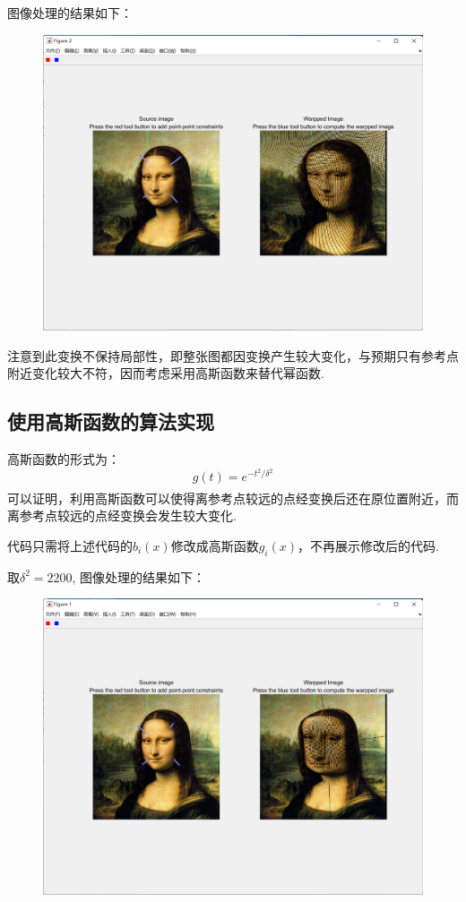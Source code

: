 \documentclass[12pt]{article}
\newcommand{\upcite}[1]{\textsuperscript{\textsuperscript{\cite{#1}}}}
\begin{document}
图像处理的结果如下：
\begin{figure}[H]
    \centering
    \includegraphics[scale=0.4]{pic1.png}
\end{figure}

注意到此变换不保持局部性，即整张图都因变换产生较大变化，与预期只有参考点附近变化较大不符，因而考虑采用高斯函数来替代幂函数.

\subsection{使用高斯函数的算法实现}
高斯函数的形式为：
\begin{equation}
    g(t)=e^{-t^2 / \delta ^2}
\end{equation}
可以证明\upcite{1}，利用高斯函数可以使得离参考点较远的点经变换后还在原位置附近，而离参考点较远的点经变换会发生较大变化.

代码只需将上述代码的$b_i (x)$修改成高斯函数$g_i (x)$，不再展示修改后的代码.

取$\delta ^2 =2200$, 图像处理的结果如下：
\begin{figure}[H]
    \centering
    \includegraphics[scale=0.4]{pic2.png}
\end{figure}
\end{document}
